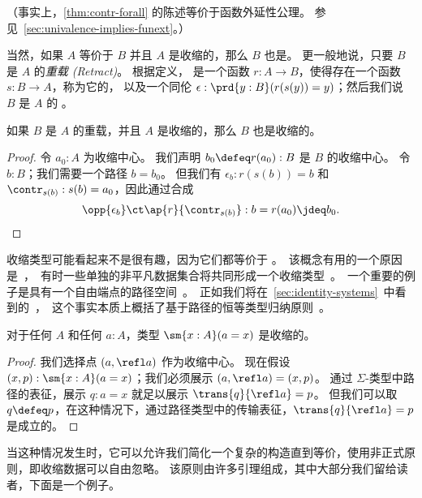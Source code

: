 %
（事实上，\cref{thm:contr-forall} 的陈述等价于函数外延性公理。
参见~\cref{sec:univalence-implies-funext}。）

当然，如果 $A$ 等价于 $B$ 并且 $A$ 是收缩的，那么 $B$ 也是。
更一般地说，只要 $B$ 是 $A$ 的\emph{重载 (Retract)}。
根据定义，
%
%
是一个函数 $r : A \to B$，使得存在一个函数 $s : B \to A$，称为它的，
%
%
以及一个同伦 $\epsilon:\prd{y:B} (r(s(y))=y)$；然后我们说 $B$ 是 $A$ 的%
%
。

\begin{lem}\label{thm:retract-contr}
如果 $B$ 是 $A$ 的重载，并且 $A$ 是收缩的，那么 $B$ 也是收缩的。
\end{lem}
\begin{proof}
  令 $a_0 : A$ 为收缩中心。
  我们声明 $b_0 \defeq r(a_0) : B$ 是 $B$ 的收缩中心。
  令 $b : B$；我们需要一个路径 $b = b_0$。
  但我们有 $\epsilon_b : r(s(b)) = b$ 和 $\contr_{s(b)} : s(b) = a_0$，因此通过合成
  \[ \opp{\epsilon_b} \ct \ap{r}{\contr_{s(b)}} : b = r(a_0) \jdeq b_0. \qedhere\]
\end{proof}

收缩类型可能看起来不是很有趣，因为它们都等价于 \unit。
该概念有用的一个原因是，有时一些单独的非平凡数据集合将共同形成一个收缩类型。
一个重要的例子是具有一个自由端点的路径空间。
正如我们将在 \cref{sec:identity-systems} 中看到的，这个事实本质上概括了基于路径的恒等类型归纳原则。

\begin{lem}\label{thm:contr-paths}
对于任何 $A$ 和任何 $a:A$，类型 $\sm{x:A} (a=x)$ 是收缩的。
\end{lem}
\begin{proof}
  我们选择点 $(a,\refl a)$ 作为收缩中心。
  现在假设 $(x,p):\sm{x:A}(a=x)$；我们必须展示 $(a,\refl a) = (x,p)$。
  通过 $\Sigma$-类型中路径的表征，展示 $q:a=x$ 就足以展示 $\trans{q}{\refl a} = p$。
  但我们可以取 $q\defeq p$，在这种情况下，通过路径类型中的传输表征，$\trans{q}{\refl a} = p$ 是成立的。
\end{proof}

当这种情况发生时，它可以允许我们简化一个复杂的构造直到等价，使用非正式原则，即收缩数据可以自由忽略。
该原则由许多引理组成，其中大部分我们留给读者，下面是一个例子。

